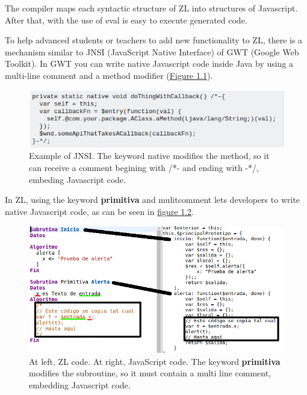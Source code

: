 \documentclass{report}
\begin{document}
	The compiler maps each syntactic structure of ZL into structures of Javascript. After that, with the use of eval\cite{javascripteval} is easy to execute generated code.
	
	To help advanced students or teachers to add new functionality to ZL, there is a mechanism similar to JNSI (JavaScript Native Interface) of GWT (Google Web Toolkit). In GWT you can write native Javascript code inside Java by using a multi-line comment and a method modifier (\hyperref[fig:jnsiexample]{Figure 1.1}).

\begin{figure}
\centering
\includegraphics[width=1\linewidth]{jnsiexample}
\caption[Example of JNSI]{Example of JNSI. The keyword native modifies the method, so it can receive a comment begining with /*- and ending with -*/, embeding Javascript code.}
\label{fig:jnsiexample}
\end{figure}

	In ZL, using the keyword \textbf{primitiva} and mulitcomment lets developers to write native Javascript code, as can be seen in \hyperref[fig:zlcode]{figure 1.2}.
	
	\begin{figure}
	\label{fig:zlcode}
	\centering
	\includegraphics[width=1\linewidth]{zlyjs}
	\caption[Native JavaScript code written in ZL]{At left, ZL code. At right, JavaScript code. The keyword \textbf{primitiva} modifies the subroutine, so it must contain a multi line comment, embedding Javascript code.}
	\end{figure}
	
\end{document}
